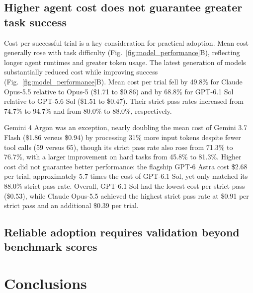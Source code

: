 \documentclass[twoside,twocolumn,9pt]{article}
\begin{document}
\subsection{Higher agent cost does not guarantee greater task success}

Cost per successful trial is a key consideration for practical adoption. Mean cost generally rose with task difficulty (Fig.~\ref{fig:model_performance}B), reflecting longer agent runtimes and greater token usage. The latest generation of models substantially reduced cost while improving success (Fig.~\ref{fig:model_performance}B). Mean cost per trial fell by 49.8\% for Claude Opus-5.5 relative to Opus-5 (\$1.71 to \$0.86) and by 68.8\% for GPT-6.1 Sol relative to GPT-5.6 Sol (\$1.51 to \$0.47). Their strict pass rates increased from 74.7\% to 94.7\% and from 80.0\% to 88.0\%, respectively. 

Gemini 4 Argon was an exception, nearly doubling the mean cost of Gemini 3.7 Flash (\$1.86 versus \$0.94) by processing 31\% more input tokens despite fewer tool calls (59 versus 65), though its strict pass rate also rose from 71.3\% to 76.7\%, with a larger improvement on hard tasks from 45.8\% to 81.3\%. Higher cost did not guarantee better performance: the flagship GPT-6 Astra cost \$2.68 per trial, approximately 5.7 times the cost of GPT-6.1 Sol, yet only matched its 88.0\% strict pass rate. Overall, GPT-6.1 Sol had the lowest cost per strict pass (\$0.53), while Claude Opus-5.5 achieved the highest strict pass rate at \$0.91 per strict pass and an additional \$0.39 per trial.

\subsection{Reliable adoption requires validation beyond benchmark scores}



\section{Conclusions}
\end{document}

